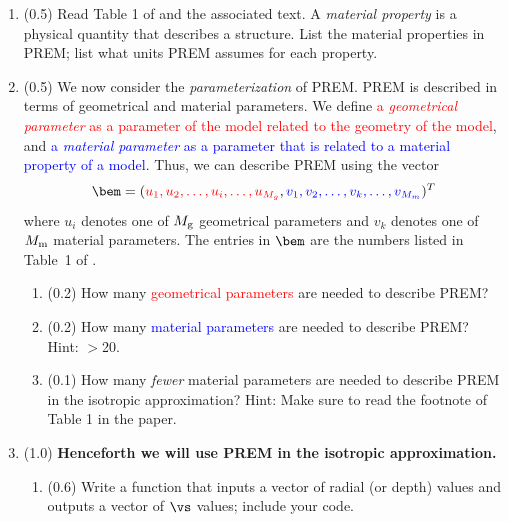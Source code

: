 \documentclass[11pt,titlepage,fleqn]{article}
\begin{document}
\begin{enumerate}

\item (0.5) Read Table 1 of \citet{PREM} and the associated text. A {\em material property} is a physical quantity that describes a structure. List the material properties in PREM; list what units PREM assumes for each property.


\item (0.5) We now consider the {\em parameterization} of PREM. PREM is described in terms of geometrical and material parameters.
We define \textcolor{red}{a {\em geometrical parameter} as a parameter of the model related to the geometry of the model},
and \textcolor{blue}{a {\em material parameter} as a parameter that is related to a material property of a model}.
Thus, we can describe PREM using the vector
%
\begin{equation}
\bem = (\textcolor{red}{u_1, u_2, \ldots, u_i, \ldots, u_{M_g}},
\textcolor{blue}{v_1, v_2, \ldots, v_k, \ldots, v_{M_m}})^T
\label{bem}
\end{equation}
%
where $u_i$ denotes one of $M_{\rm g}$ geometrical parameters and $v_k$ denotes one of $M_{\rm m}$ material parameters.
The entries in $\bem$ are the numbers listed in Table~1 of \citet{PREM}.

\begin{enumerate}
\item (0.2) How many \textcolor{red}{geometrical parameters} are needed to describe PREM?
\item (0.2) How many \textcolor{blue}{material parameters} are needed to describe PREM? Hint: $>$20.
\item (0.1) How many {\em fewer} material parameters are needed to describe PREM in the isotropic approximation? Hint: Make sure to read the footnote of Table 1 in the paper.
\end{enumerate}



\item (1.0) {\bf Henceforth we will use PREM in the isotropic approximation.}


\begin{enumerate}
\item (0.6) Write a function that inputs a vector of radial (or depth) values and outputs a vector of $\vs$ values; include your code.


\end{enumerate}
\end{enumerate}
\end{document}

